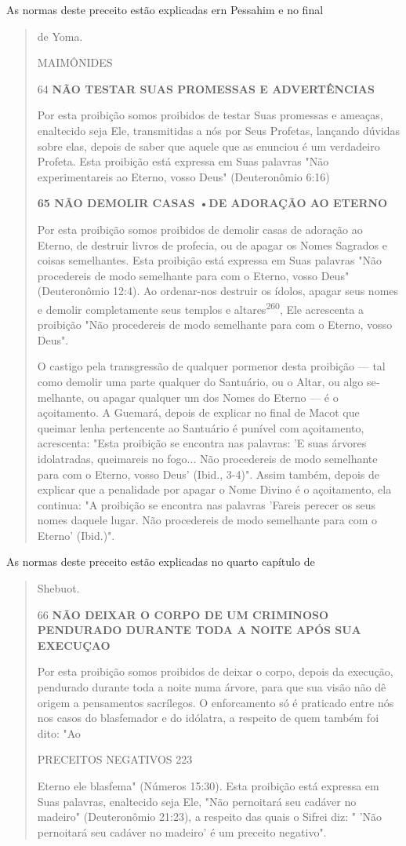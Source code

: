As normas deste preceito estão explicadas ern Pessahim e no final

\begin{quote}
de Yoma.

MAIMÔNIDES

64 \textbf{NÃO TESTAR SUAS PROMESSAS E ADVERTÊNCIAS}

Por esta proibição somos proibidos de testar Suas promessas e amea­ças,
enaltecido seja Ele, transmitidas a nós por Seus Profetas, lançando
dúvidas sobre elas, depois de saber que aquele que as enunciou é um
verdadeiro Profe­ta. Esta proibição está expressa em Suas palavras "Não
experimentareis ao Eter­no, vosso Deus" (Deuteronômio 6:16)

\textbf{65 NÃO DEMOLIR CASAS •DE ADORAÇÃO AO ETERNO}

Por esta proibição somos proibidos de demolir casas de adoração ao
Eterno, de destruir livros de profecia, ou de apagar os Nomes Sagrados e
coisas semelhantes. Esta proibição está expressa em Suas palavras "Não
proce­dereis de modo semelhante para com o Eterno, vosso Deus"
(Deuteronômio 12:4). Ao ordenar-nos destruir os ídolos, apagar seus
nomes e demolir comple­tamente seus templos e
altares\textsuperscript{260}, Ele acrescenta a proibição "Não
procedereis de modo semelhante para com o Eterno, vosso Deus".

O castigo pela transgressão de qualquer pormenor desta proibição --- tal
como demolir uma parte qualquer do Santuário, ou o Altar, ou algo
se­melhante, ou apagar qualquer um dos Nomes do Eterno --- é o
açoitamento. A Guemará, depois de explicar no final de Macot que queimar
lenha pertencen­te ao Santuário é punível com açoitamento, acrescenta:
"Esta proibição se en­contra nas palavras: 'E suas árvores idolatradas,
queimareis no fogo... Não pro­cedereis de modo semelhante para com o
Eterno, vosso Deus' (Ibid., 3-4)". As­sim também, depois de explicar que
a penalidade por apagar o Nome Divino é o açoitamento, ela continua: "A
proibição se encontra nas palavras 'Fareis perecer os seus nomes daquele
lugar. Não procedereis de modo semelhante para com o Eterno' (Ibid.)".
\end{quote}

As normas deste preceito estão explicadas no quarto capítulo de

\begin{quote}
Shebuot.

66 \textbf{NÃO DEIXAR O CORPO DE UM CRIMINOSO PENDURADO DURANTE TODA A
NOITE APÓS SUA EXECUÇAO}

Por esta proibição somos proibidos de deixar o corpo, depois da
exe­cução, pendurado durante toda a noite numa árvore, para que sua
visão não dê origem a pensamentos sacrílegos. O enforcamento só é
praticado entre nós nos casos do blasfemador e do idólatra, a respeito
de quem também foi dito: "Ao

PRECEITOS NEGATIVOS 223

Eterno ele blasfema" (Números 15:30). Esta proibição está expressa em
Suas palavras, enaltecido seja Ele, "Não pernoitará seu cadáver no
madeiro" (Deute­ronômio 21:23), a respeito das quais o Sifrei diz: "
'Não pernoitará seu cadáver no madeiro' é um preceito negativo".
\end{quote}

